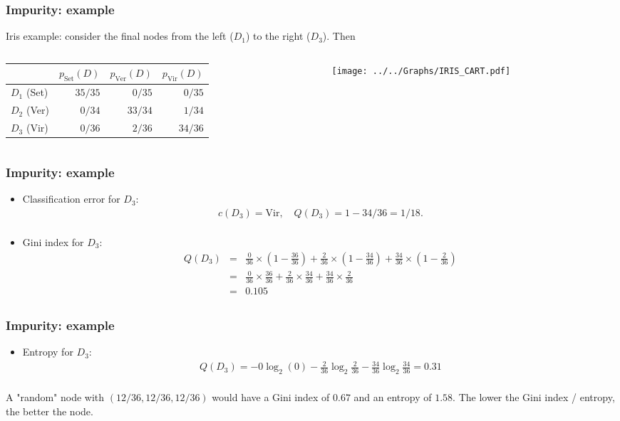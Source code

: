 \begin{frame}
\frametitle{Impurity: example}
Iris example: consider the final nodes from the left ($D_1$) to the right ($D_3$). Then
\begin{columns}
\begin{column}{0.5\textwidth}
\scriptsize
\begin{tabular}{|l|r|r|r|}
\hline
& $p_{\mbox{Set}}(D)$ & $p_{\mbox{Ver}}(D)$ & $p_{\mbox{Vir}}(D)$ \\
\hline
$D_1$ (Set) & $35/35$ & $0/35$ & $0/35$\\
\hline
$D_2$ (Ver) & $0/34$ & $33/34$ & $1/34$\\
\hline
$D_3$ (Vir) & $0/36$ & $2/36$ & $34/36$\\
\hline
\end{tabular}
\normalsize
\end{column}
\begin{column}{0.5\textwidth}
\begin{center}
\texttt{[image: ../../Graphs/IRIS\_CART.pdf]}
\end{center}
\end{column}
\end{columns}
\end{frame}
\begin{frame}
\frametitle{Impurity: example}
\begin{itemize}
\item Classification error for $D_3$:  
\begin{eqnarray*}
c(D_3)= \mbox{Vir}, \quad Q(D_3)= 1 - 34/36 = 1/18.\\
\end{eqnarray*}
\item Gini index for $D_3$:
\begin{eqnarray*}
Q(D_3)&=& \frac{0}{36}\times\left(1-\frac{36}{36}\right) + \frac{2}{36}\times\left(1-\frac{34}{36}\right) + \frac{34}{36}\times \left(1-\frac{2}{36}\right)\\
&=& \frac{0}{36}\times\frac{36}{36} + \frac{2}{36}\times\frac{34}{36} + \frac{34}{36}\times\frac{2}{36}\\
&=& 0.105\\
\end{eqnarray*}
\end{itemize}
\end{frame}
\begin{frame}
\frametitle{Impurity: example}
\begin{itemize}
\item Entropy for $D_3$:
\begin{eqnarray*}
Q(D_3)= -0\log_2(0)-\frac{2}{36}\log_2\frac{2}{36} - \frac{34}{36}\log_2\frac{34}{36}=0.31\\
\end{eqnarray*}
\end{itemize}
A "random" node with $(12/36, 12/36, 12/36)$ would have a Gini index of $0.67$ and an entropy of $1.58$. The lower the Gini index / entropy, the better the node.
\end{frame}
